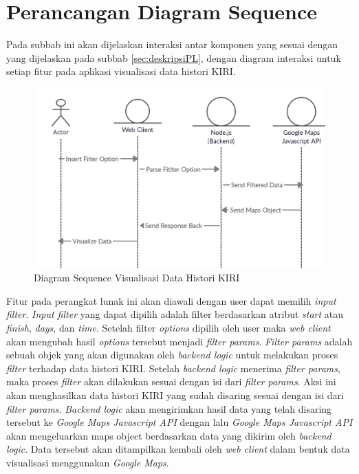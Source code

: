 \section{Perancangan Diagram Sequence}
Pada subbab ini akan dijelaskan interaksi antar komponen yang  sesuai dengan yang dijelaskan pada subbab \ref{sec:deskripsiPL}, dengan diagram interaksi untuk setiap fitur pada aplikasi visualisasi data histori KIRI.


\begin{figure}[H]
	\centering  
	\includegraphics[scale=0.3]{Gambar/Kiri_Sequence_Diagram.png}  
	\caption[Rancangan Diagram Interaksi]{Diagram Sequence Visualisasi Data Histori KIRI} 
	\label{fig:interactionDiagram} 
\end{figure}

Fitur pada perangkat lunak ini akan diawali dengan user dapat memilih \textit{input filter}. \textit{Input filter} yang dapat dipilih adalah filter berdasarkan atribut \textit{start} atau \textit{finish}, \textit{days}, dan \textit{time}. Setelah filter \textit{options} dipilih oleh user maka \textit{web client} akan mengubah hasil \textit{options} tersebut menjadi \textit{filter params}. \textit{Filter params} adalah sebuah objek yang akan digunakan oleh \textit{backend logic} untuk melakukan proses \textit{filter} terhadap data histori KIRI. Setelah \textit{backend logic} menerima \textit{filter params}, maka proses \textit{filter} akan dilakukan sesuai dengan isi dari \textit{filter params}. Aksi ini akan menghasilkan data histori KIRI yang sudah disaring sesuai dengan isi dari \textit{filter params}. \textit{Backend logic} akan mengirimkan hasil data yang telah disaring tersebut ke \textit{Google Maps Javascript API} dengan lalu \textit{Google Maps Javascript API} akan mengeluarkan maps object berdasarkan data yang dikirim oleh \textit{backend logic}. Data tersebut akan ditampilkan kembali oleh \textit{web client} dalam bentuk data visualisasi menggunakan \textit{Google Maps}.


